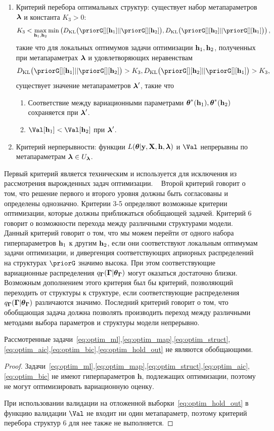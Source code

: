 \begin{defin}
\begin{enumerate}
\item Критерий перебора оптимальных структур: существует набор метапараметров $\boldsymbol{\lambda}$ и константа $K_3>0:$  $$K_3 < \max_{\mathbf{h}_1, \mathbf{h}_2} \min\left(\KL{\priorG[][\h_1]}{\priorG[][\h_2]},\KL{\priorG[][\h_2]}{\priorG[][\h_1]}\right),$$ такие что для локальных оптимумов задачи оптимизации $\mathbf{h}_1,\mathbf{h}_2$, полученных при метапараметрах $\boldsymbol{\lambda}$ и удовлетворяющих неравенствам $$\KL{\priorG[][\h_1]}{\priorG[][\h_2]} > K_3, \KL{\priorG[][\h_2]}{\priorG[][\h_1]}>K_3,$$  существует значение метапараметров $\boldsymbol{\lambda}'$, такие что
\begin{enumerate}
\item Соответствие между вариационными параметрами $\boldsymbol{\theta}^{*}(\mathbf{h}_1),\boldsymbol{\theta}^{*}(\mathbf{h}_2)$ сохраняется при  $\boldsymbol{\lambda}'$.
\item  $\Val[\h_1] < \Val[\h_2]$ при $\boldsymbol{\lambda}'$.
\end{enumerate}


\item Критерий нерперывности: функции $L(\boldsymbol{\theta} |\mathbf{y},\mathbf{X},\mathbf{h},\boldsymbol{\lambda})$ и $\Val$ непрерывны по метапараметрам $\boldsymbol{\lambda} \in U_{\boldsymbol{\lambda}}$.
\end{enumerate}
\end{defin}
Первый критерий является техническим и используется для исключения из рассмотрения вырожденных задач оптимизации.  
Второй критерий говорит о том, что решение первого и второго уровня должны быть согласованы и определены однозначно.
Критерии 3-5 определяют возможные критерии оптимизации, которые должны приближаться обобщающей задачей.
Критерий 6 говорит о возможности перехода между различными структурами модели. Данный критерий говорит о том, что мы можем перейти от одного набора гиперпараметров $\mathbf{h}_1$ к другим $\mathbf{h}_2$, если они соответствуют локальным оптимумам задачи оптимизации, и дивергенция соответствующих априорных  распределений на структурах $\priorG$ значимо высока. При этом соответствующие вариационные распределения $q_{\boldsymbol{\Gamma}}(\boldsymbol{\Gamma}|\boldsymbol{\theta}_{\boldsymbol{\Gamma}})$ могут оказаться достаточно близки. Возможным дополнением этого критерия был бы критерий, позволяющий переходить от структуры к структуре, если соответствующие распределения $q_{\boldsymbol{\Gamma}}(\boldsymbol{\Gamma}|\boldsymbol{\theta}_{\boldsymbol{\Gamma}})$ различаются значимо.
Последний критерий говорит о том, что обобщающая задача должна позволять производить переход между различными методами выбора  параметров и структуры модели непрерывно.

\begin{theorem}Рассмотренные задачи~\eqref{eq:optim_ml},\eqref{eq:optim_map},\eqref{eq:optim_struct},\eqref{eq:optim_aic},\eqref{eq:optim_bic},\eqref{eq:optim_hold_out} не являются обобщающими.
\end{theorem}
\begin{proof}
Задачи~\eqref{eq:optim_ml},\eqref{eq:optim_map},\eqref{eq:optim_struct},\eqref{eq:optim_aic},\eqref{eq:optim_bic} не имеют гиперпараметров $\mathbf{h}$, подлежащих оптимизации, поэтому не могут оптимизировать вариационную оценку.

При  использовании валидации на отложенной выборки~\eqref{eq:optim_hold_out} в функцию валидации $\Val$ не входит ни один метапараметр, поэтому критерий перебора структур 6 для нее также не выполняется. 

\end{proof}

